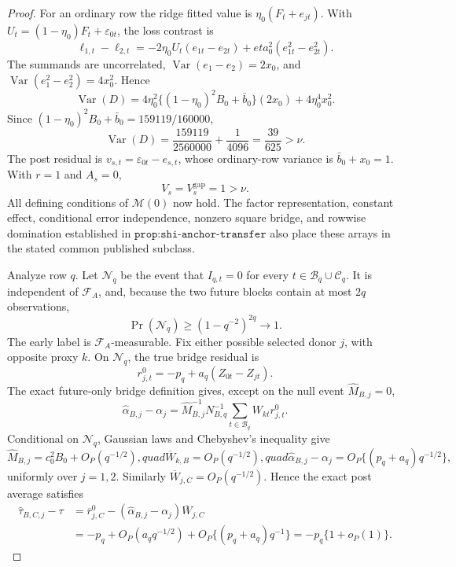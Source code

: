 \documentclass{article}
\begin{document}
\begin{proof}
For an ordinary row the ridge fitted value is \(\eta_0(F_t+e_{jt})\).  With \(U_t=(1-\eta_0)F_t+\varepsilon_{0t}\), the loss contrast is
\[
 \ell_{1,t}-\ell_{2,t}
 =-2\eta_0U_t(e_{1t}-e_{2t})+eta_0^2(e_{1t}^2-e_{2t}^2).
\]
The summands are uncorrelated, \(\operatorname{Var}(e_1-e_2)=2x_0\), and \(\operatorname{Var}(e_1^2-e_2^2)=4x_0^2\).  Hence
\[
 \operatorname{Var}(D)
 =4\eta_0^2\{(1-\eta_0)^2B_0+\bar b_0\}(2x_0)
 +4\eta_0^4x_0^2.
\]
Since \((1-\eta_0)^2B_0+\bar b_0=159119/160000\),
\[
 \operatorname{Var}(D)=\frac{159119}{2560000}+\frac1{4096}
 =\frac{39}{625}>\nu.
\]
The post residual is \(v_{s,t}=\varepsilon_{0t}-e_{s,t}\), whose ordinary-row variance is \(\bar b_0+x_0=1\).  With \(r=1\) and \(A_s=0\),
\[
 V_s=V_s^{\mathrm{gap}}=1>\nu.
\]
All defining conditions of \(\mathcal M(0)\) now hold.  The factor representation, constant effect, conditional error independence, nonzero square bridge, and rowwise domination established in \(\texttt{prop:shi-anchor-transfer}\) also place these arrays in the stated common published subclass.

Analyze row \(q\).  Let \(\mathcal N_q\) be the event that \(I_{q,t}=0\) for every \(t\in\mathcal B_q\cup\mathcal C_q\).  It is independent of \(\mathcal F_A\), and, because the two future blocks contain at most \(2q\) observations,
\[
 \Pr(\mathcal N_q)\geq(1-q^{-2})^{2q}\to1.
\]
The early label is \(\mathcal F_A\)-measurable.  Fix either possible selected donor \(j\), with opposite proxy \(k\).  On \(\mathcal N_q\), the true bridge residual is
\[
 r_{j,t}^0=-p_q+a_q(Z_{0t}-Z_{jt}).
\]
The exact future-only bridge definition gives, except on the null event \(\widehat M_{B,j}=0\),
\[
 \widehat\alpha_{B,j}-\alpha_j
 =\widehat M_{B,j}^{-1}N_{B,q}^{-1}
  \sum_{t\in\mathcal B_q}W_{kt}r_{j,t}^0.
\]
Conditional on \(\mathcal N_q\), Gaussian laws and Chebyshev's inequality give
\[
 \widehat M_{B,j}=c_0^2B_0+O_P(q^{-1/2}),quad
 \overline W_{k,B}=O_P(q^{-1/2}),quad
 \widehat\alpha_{B,j}-\alpha_j
 =O_P\{(p_q+a_q)q^{-1/2}\},
\]
uniformly over \(j=1,2\).  Similarly \(\overline W_{j,C}=O_P(q^{-1/2})\).  Hence the exact post average satisfies
\[
 \begin{aligned}
 \widehat\tau_{B,C,j}-\tau
 &=\overline r_{j,C}^0-(\widehat\alpha_{B,j}-\alpha_j)\overline W_{j,C}\\
 &=-p_q+O_P(a_qq^{-1/2})+O_P\{(p_q+a_q)q^{-1}\}
 =-p_q\{1+o_P(1)\}.
 \end{aligned}
\]


\end{proof}
\end{document}
